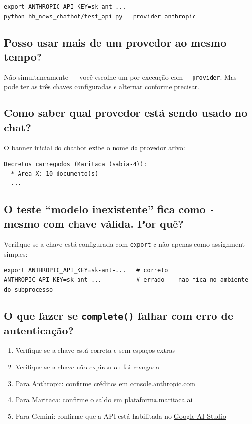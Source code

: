 \documentclass[12pt,a4paper]{article}
\begin{document}
\begin{lstlisting}
export ANTHROPIC_API_KEY=sk-ant-...
python bh_news_chatbot/test_api.py --provider anthropic
\end{lstlisting}

\subsection{Posso usar mais de um provedor ao mesmo tempo?}

Não simultaneamente --- você escolhe um por execução com \texttt{-{}-provider}. Mas pode
ter as três chaves configuradas e alternar conforme precisar.

\subsection{Como saber qual provedor está sendo usado no chat?}

O banner inicial do chatbot exibe o nome do provedor ativo:

\begin{lstlisting}
Decretos carregados (Maritaca (sabia-4)):
  * Area X: 10 documento(s)
  ...
\end{lstlisting}

\subsection{O teste ``modelo inexistente'' fica como \texttt{-} mesmo com chave válida. Por quê?}

Verifique se a chave está configurada com \texttt{export} e não apenas como assignment
simples:

\begin{lstlisting}
export ANTHROPIC_API_KEY=sk-ant-...   # correto
ANTHROPIC_API_KEY=sk-ant-...          # errado -- nao fica no ambiente do subprocesso
\end{lstlisting}

\subsection{O que fazer se \texttt{complete()} falhar com erro de autenticação?}

\begin{enumerate}
  \item Verifique se a chave está correta e sem espaços extras
  \item Verifique se a chave não expirou ou foi revogada
  \item Para Anthropic: confirme créditos em \href{https://console.anthropic.com}{console.anthropic.com}
  \item Para Maritaca: confirme o saldo em \href{https://plataforma.maritaca.ai}{plataforma.maritaca.ai}
  \item Para Gemini: confirme que a API está habilitada no \href{https://aistudio.google.com}{Google AI Studio}
\end{enumerate}
\end{document}
